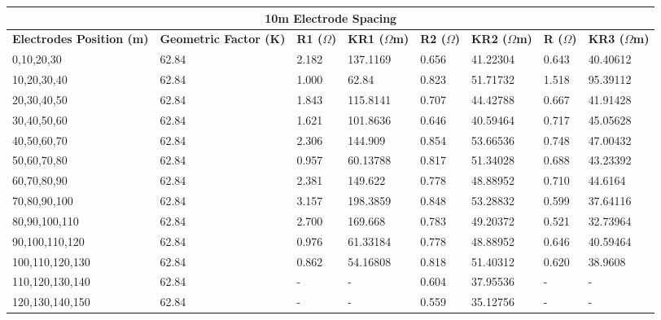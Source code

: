 \documentclass[12pt,a4paper]{report}
\begin{document}
\begin{table}[h!]
    \centering
    \begin{adjustbox}{max width=\textwidth}
    \setlength{\tabcolsep}{15pt}
    \renewcommand{\arraystretch}{1.5}
    \begin{tabular}{|p{3.5cm}|p{2.5cm}|p{1.8cm}|p{2.2cm}|p{1.8cm}|p{2.2cm}|p{1.8cm}|p{2.2cm}|}
    \hline
    \multicolumn{8}{|c|}{\rule{0pt}{3em}\huge\textbf{10m Electrode Spacing}} \\ [0.5cm]
    \hline
    \textbf{Electrodes Position (m)} & \textbf{Geometric Factor (K)} & \textbf{R1 ($\Omega$)} & \textbf{KR1 ($\Omega$m)} & \textbf{R2 ($\Omega$)} & \textbf{KR2 ($\Omega$m)} & \textbf{R ($\Omega$)} & \textbf{KR3 ($\Omega$m)} \\ \hline
    0,10,20,30 & 62.84 & 2.182 & 137.1169 & 0.656 & 41.22304 & 0.643 & 40.40612 \\ \hline
    10,20,30,40 & 62.84 & 1.000 & 62.84 & 0.823 & 51.71732 & 1.518 & 95.39112 \\ \hline
    20,30,40,50 & 62.84 & 1.843 & 115.8141 & 0.707 & 44.42788 & 0.667 & 41.91428 \\ \hline
    30,40,50,60 & 62.84 & 1.621 & 101.8636 & 0.646 & 40.59464 & 0.717 & 45.05628 \\ \hline
    40,50,60,70 & 62.84 & 2.306 & 144.909 & 0.854 & 53.66536 & 0.748 & 47.00432 \\ \hline
    50,60,70,80 & 62.84 & 0.957 & 60.13788 & 0.817 & 51.34028 & 0.688 & 43.23392 \\ \hline
    60,70,80,90 & 62.84 & 2.381 & 149.622 & 0.778 & 48.88952 & 0.710 & 44.6164 \\ \hline
    70,80,90,100 & 62.84 & 3.157 & 198.3859 & 0.848 & 53.28832 & 0.599 & 37.64116 \\ \hline
    80,90,100,110 & 62.84 & 2.700 & 169.668 & 0.783 & 49.20372 & 0.521 & 32.73964 \\ \hline
    90,100,110,120 & 62.84 & 0.976 & 61.33184 & 0.778 & 48.88952 & 0.646 & 40.59464 \\ \hline
    100,110,120,130 & 62.84 & 0.862 & 54.16808 & 0.818 & 51.40312 & 0.620 & 38.9608 \\ \hline
    110,120,130,140 & 62.84 & - & - & 0.604 & 37.95536 & - & - \\ \hline
    120,130,140,150 & 62.84 & - & - & 0.559 & 35.12756 & - & - \\ \hline
    \end{tabular}
\end{adjustbox}
\end{table}
\end{document}
